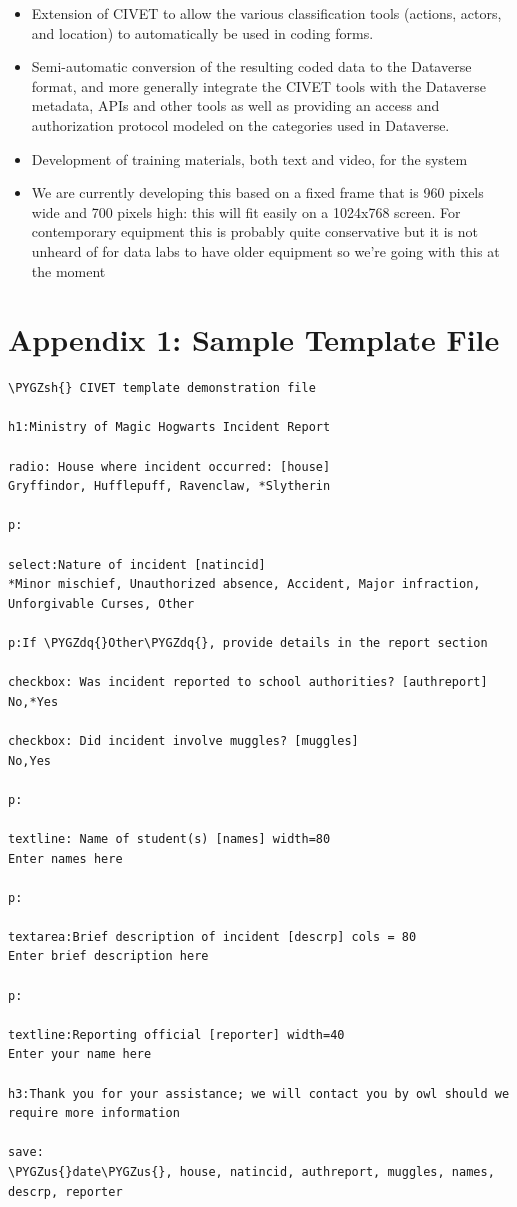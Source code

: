 \documentclass[letterpaper,10pt,english]{sphinxmanual}
\def\PYGZus{\char`\_}
\def\PYGZsh{\char`\#}
\def\PYGZdq{\char`\"}
\begin{document}
\begin{itemize}
\item {} 
Extension of CIVET to allow the various classification tools
(actions, actors, and location) to automatically be used in coding
forms.

\item {} 
Semi-automatic conversion of the resulting coded data to the
Dataverse format, and more generally integrate the CIVET tools with
the Dataverse metadata, APIs and other tools as well as providing an
access and authorization protocol modeled on the categories used in
Dataverse.

\item {} 
Development of training materials, both text and video, for the
system

\item {} 
We are currently developing this based on a fixed frame that is 960
pixels wide and 700 pixels high: this will fit easily on a 1024x768
screen. For contemporary equipment this is probably quite
conservative but it is not unheard of for data labs to have older
equipment so we’re going with this at the moment

\end{itemize}


\chapter{Appendix 1: Sample Template File}
\label{appendix1:appendix-1-sample-template-file}\label{appendix1::doc}
\begin{Verbatim}[commandchars=\\\{\}]
\PYGZsh{} CIVET template demonstration file

h1:Ministry of Magic Hogwarts Incident Report

radio: House where incident occurred: [house]
Gryffindor, Hufflepuff, Ravenclaw, *Slytherin

p:

select:Nature of incident [natincid]
*Minor mischief, Unauthorized absence, Accident, Major infraction, Unforgivable Curses, Other

p:If \PYGZdq{}Other\PYGZdq{}, provide details in the report section

checkbox: Was incident reported to school authorities? [authreport]
No,*Yes

checkbox: Did incident involve muggles? [muggles]
No,Yes

p:

textline: Name of student(s) [names] width=80
Enter names here

p:

textarea:Brief description of incident [descrp] cols = 80
Enter brief description here

p:

textline:Reporting official [reporter] width=40
Enter your name here

h3:Thank you for your assistance; we will contact you by owl should we require more information

save:
\PYGZus{}date\PYGZus{}, house, natincid, authreport, muggles, names, descrp, reporter
\end{Verbatim}
\end{document}

